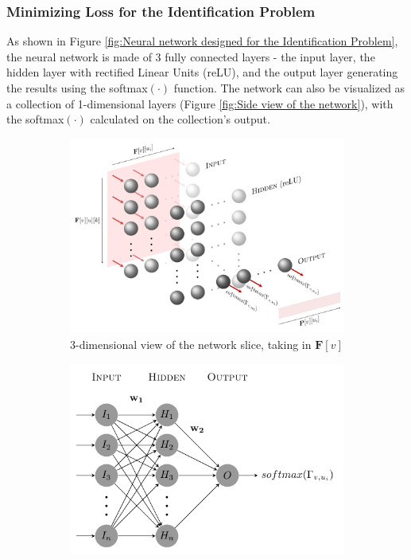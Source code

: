 \documentclass[12pt]{article}
\newcommand{\matr}[1]{\mathbf{#1}}  %
\begin{document}
    \subsubsection{Minimizing Loss for the Identification Problem} \label{sec:Minimizing Loss for the Identification Problem}
    As shown in Figure \ref{fig:Neural network designed for the Identification Problem}, the neural network is made of 3 fully connected layers - the input layer, the hidden layer with rectified Linear Units (reLU), and the output layer generating the results using the softmax$(\cdot)$ function. The network can also be visualized as a collection of 1-dimensional layers (Figure \ref{fig:Side view of the network}), with the softmax$(\cdot)$ calculated on the collection's output.
    \begin{figure}[!htbp]
        \begin{subfigure}{.64\textwidth}
        \includegraphics[width=\textwidth]{weights_net}
        \caption{3-dimensional view of the network slice, taking in $\matr{F}[v]$}
        \label{fig:3-dimensional view of the network slice, taking in Fv}
        \end{subfigure}
        \begin{subfigure}{.35\textwidth}
            \includegraphics[width=\textwidth]{weights_net_side}

\end{subfigure}
\end{figure}
\end{document}
